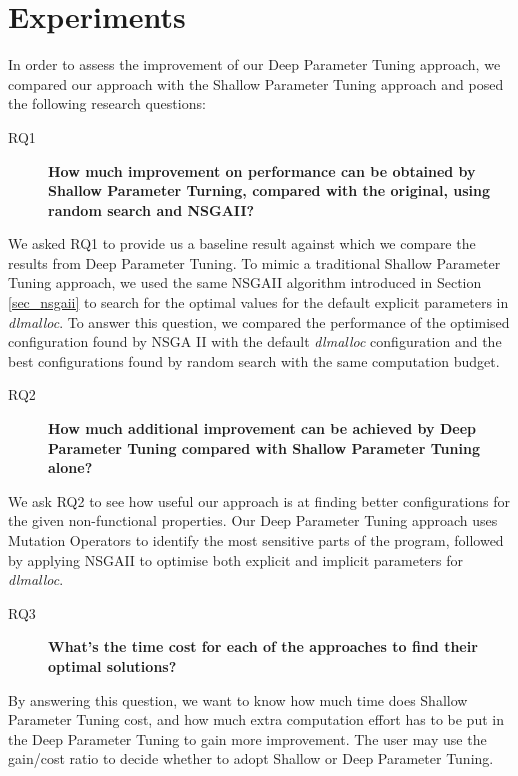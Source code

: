 
\section{Experiments}

In order to assess the improvement of our Deep Parameter Tuning approach, we compared our approach with the Shallow Parameter Tuning approach and posed the following research questions: 
 

\begin{description}
 \item[RQ1] {\bf How much improvement on performance can be obtained by Shallow Parameter Turning, compared with the original, using random search and NSGAII? }
\end{description}

We asked RQ1 to provide us a baseline result against which we compare the results from Deep Parameter Tuning. To mimic a traditional Shallow Parameter Tuning approach, we used the same NSGAII algorithm introduced in Section \ref{sec_nsgaii} to search for the optimal values for the default explicit parameters in \emph{dlmalloc}. To answer this question, we compared the performance of the optimised configuration found by NSGA II with the default \emph{dlmalloc} configuration and the best configurations found by random search with the same computation budget.  

\begin{description}
\item[RQ2] {\bf How much additional improvement can be achieved by Deep Parameter Tuning compared with Shallow Parameter Tuning alone? }
\end{description}

We ask RQ2 to see how useful our approach is at finding better configurations for the given non-functional properties. Our Deep Parameter Tuning approach uses Mutation Operators to identify the most sensitive parts of the program, followed by applying NSGAII to optimise both explicit and implicit parameters for \emph{dlmalloc}. %

\begin{description}
\item[RQ3] {\bf What's the time cost for each of the approaches to find their optimal solutions? }
\end{description} 

By answering this question, we want to know how much time does Shallow Parameter Tuning cost, and how much extra computation effort has to be put in the Deep Parameter Tuning to gain more improvement. The user may use the gain/cost ratio to decide whether to adopt Shallow or Deep Parameter Tuning.

